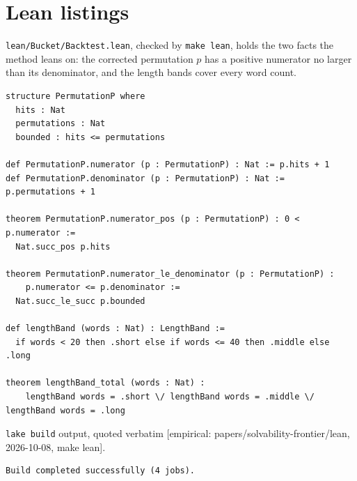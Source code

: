 \documentclass[11pt]{article}
\newcommand{\emp}[1]{\textcolor{bucketgray}{\footnotesize [empirical: #1]}}
\begin{document}
\footnotesize

\normalsize

\section{Lean listings}
\label{app:lean}

\texttt{lean/Bucket/Backtest.lean}, checked by \texttt{make lean}, holds the two facts the method leans on: the corrected permutation $p$ has a positive numerator no larger than its denominator, and the length bands cover every word count.

\begin{lstlisting}[style=bucketlean]
structure PermutationP where
  hits : Nat
  permutations : Nat
  bounded : hits <= permutations

def PermutationP.numerator (p : PermutationP) : Nat := p.hits + 1
def PermutationP.denominator (p : PermutationP) : Nat := p.permutations + 1

theorem PermutationP.numerator_pos (p : PermutationP) : 0 < p.numerator :=
  Nat.succ_pos p.hits

theorem PermutationP.numerator_le_denominator (p : PermutationP) :
    p.numerator <= p.denominator :=
  Nat.succ_le_succ p.bounded

def lengthBand (words : Nat) : LengthBand :=
  if words < 20 then .short else if words <= 40 then .middle else .long

theorem lengthBand_total (words : Nat) :
    lengthBand words = .short \/ lengthBand words = .middle \/ lengthBand words = .long
\end{lstlisting}

\texttt{lake build} output, quoted verbatim \emp{papers/solvability-frontier/lean, 2026-10-08, make lean}.
\begin{verbatim}
Build completed successfully (4 jobs).
\end{verbatim}
\end{document}
